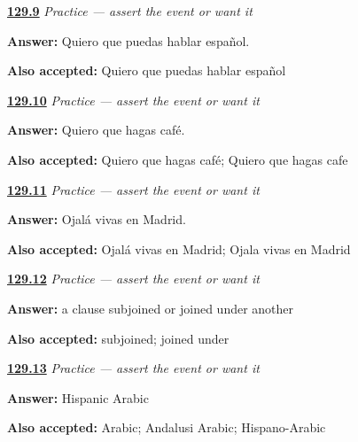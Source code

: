 \noindent\begin{minipage}[t]{\linewidth}
\raggedright
\hyperlink{review-ES-C18-practice-poder}{\textbf{129.9}} \emph{Practice — assert the event or want it}\par
\small \textbf{Answer:} Quiero que puedas hablar español.\par
\footnotesize \textbf{Also accepted:} Quiero que puedas hablar español
\end{minipage}\par\medskip

\noindent\begin{minipage}[t]{\linewidth}
\raggedright
\hyperlink{review-ES-C18-practice-hacer}{\textbf{129.10}} \emph{Practice — assert the event or want it}\par
\small \textbf{Answer:} Quiero que hagas café.\par
\footnotesize \textbf{Also accepted:} Quiero que hagas café; Quiero que hagas cafe
\end{minipage}\par\medskip

\noindent\begin{minipage}[t]{\linewidth}
\raggedright
\hyperlink{review-ES-C18-practice-ojala}{\textbf{129.11}} \emph{Practice — assert the event or want it}\par
\small \textbf{Answer:} Ojalá vivas en Madrid.\par
\footnotesize \textbf{Also accepted:} Ojalá vivas en Madrid; Ojala vivas en Madrid
\end{minipage}\par\medskip

\noindent\begin{minipage}[t]{\linewidth}
\raggedright
\hyperlink{review-ES-C18-practice-subjunctive-name}{\textbf{129.12}} \emph{Practice — assert the event or want it}\par
\small \textbf{Answer:} a clause subjoined or joined under another\par
\footnotesize \textbf{Also accepted:} subjoined; joined under
\end{minipage}\par\medskip

\noindent\begin{minipage}[t]{\linewidth}
\raggedright
\hyperlink{review-ES-C18-practice-ojala-source}{\textbf{129.13}} \emph{Practice — assert the event or want it}\par
\small \textbf{Answer:} Hispanic Arabic\par
\footnotesize \textbf{Also accepted:} Arabic; Andalusi Arabic; Hispano-Arabic
\end{minipage}\par\medskip

